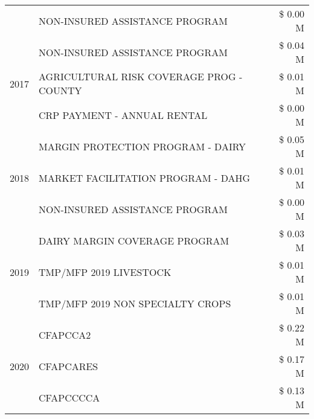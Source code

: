 \begin{tabular}{llr}
 & NON-INSURED ASSISTANCE PROGRAM & \$ 0.00 M \\
\cline{1-3}
\multirow[t]{3}{*}{2017} & NON-INSURED ASSISTANCE PROGRAM & \$ 0.04 M \\
 & AGRICULTURAL RISK COVERAGE PROG - COUNTY & \$ 0.01 M \\
 & CRP PAYMENT - ANNUAL RENTAL & \$ 0.00 M \\
\cline{1-3}
\multirow[t]{3}{*}{2018} & MARGIN PROTECTION PROGRAM - DAIRY & \$ 0.05 M \\
 & MARKET FACILITATION PROGRAM - DAHG & \$ 0.01 M \\
 & NON-INSURED ASSISTANCE PROGRAM & \$ 0.00 M \\
\cline{1-3}
\multirow[t]{3}{*}{2019} & DAIRY MARGIN COVERAGE PROGRAM & \$ 0.03 M \\
 & TMP/MFP 2019 LIVESTOCK & \$ 0.01 M \\
 & TMP/MFP 2019 NON SPECIALTY CROPS & \$ 0.01 M \\
\cline{1-3}
\multirow[t]{3}{*}{2020} & CFAPCCA2 & \$ 0.22 M \\
 & CFAPCARES & \$ 0.17 M \\
 & CFAPCCCCA & \$ 0.13 M \\
\cline{1-3}
\bottomrule
\end{tabular}

